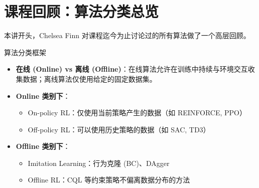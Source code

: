 \section{课程回顾：算法分类总览}

本讲开头，Chelsea Finn 对课程迄今为止讨论过的所有算法做了一个高层回顾。

\begin{importantbox}{算法分类框架}
\begin{itemize}
    \item \textbf{在线 (Online) vs 离线 (Offline)}：在线算法允许在训练中持续与环境交互收集数据；离线算法仅使用给定的固定数据集。
    \item \textbf{Online 类别下}：
    \begin{itemize}
        \item On-policy RL：仅使用当前策略产生的数据（如 REINFORCE, PPO）
        \item Off-policy RL：可以使用历史策略的数据（如 SAC, TD3）
    \end{itemize}
    \item \textbf{Offline 类别下}：
    \begin{itemize}
        \item Imitation Learning：行为克隆 (BC)、DAgger
        \item Offline RL：CQL 等约束策略不偏离数据分布的方法
    \end{itemize}
\end{itemize}
\end{importantbox}

